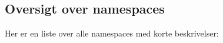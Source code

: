 \subsection{Oversigt over namespaces}
Her er en liste over alle namespaces med korte beskrivelser\+:\begin{DoxyCompactList}
\item{}
\end{DoxyCompactList}
